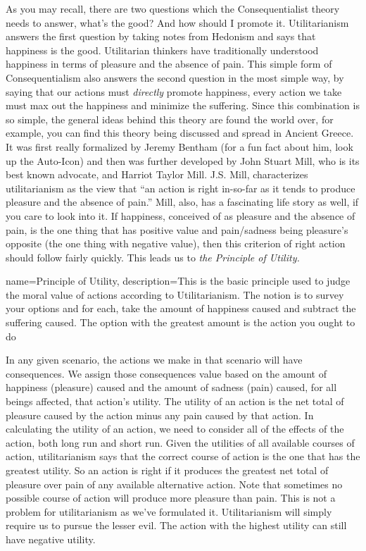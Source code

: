 As you may recall, there are two questions which the Consequentialist theory needs to answer, what's the good? And how should I promote it. Utilitarianism answers the first question by taking notes from Hedonism and says that happiness is the good. Utilitarian thinkers have traditionally understood happiness in terms of pleasure and the absence of pain. This simple form of Consequentialism also answers the second question in the most simple way, by saying that our actions must \emph{directly} promote happiness, every action we take must max out the happiness and minimize the suffering. Since this combination is so simple,  the general ideas behind this theory are found the world over, for example, you can find this theory being discussed and spread in Ancient Greece. It was first really formalized by Jeremy Bentham (for a fun fact about him, look up the Auto-Icon) and then was further developed by John Stuart Mill, who is its best known advocate, and Harriot Taylor Mill.\autocite{Driver3} J.S. Mill, characterizes utilitarianism as the view that “an action is right in-so-far as it tends to produce pleasure and the absence of pain.” Mill, also, has a fascinating life story as well, if you care to look into it.  If happiness, conceived of as pleasure and the absence of pain, is the one thing that has positive value and pain/sadness being pleasure's opposite (the one thing with negative value), then this criterion of right action should follow fairly quickly. This leads us to \emph{the \gls{Principle of Utility}.}

{
  name=Principle of Utility,
  description={This is the basic principle used to judge the moral value of actions according to Utilitarianism. The notion is to survey your options and for each, take the amount of happiness caused and subtract the suffering caused. The option with the greatest amount is the action you ought to do}
}


In any given scenario, the actions we make in that scenario will have consequences. We assign those consequences value based on the amount of happiness (pleasure) caused and the amount of sadness (pain) caused, for all beings affected, that action's utility. The utility of an action is the net total of pleasure caused by the action minus any pain caused by that action. In calculating the utility of an action, we need to consider all of the effects of the action, both long run and short run. Given the utilities of all available courses of action, utilitarianism says that the correct course of action is the one that has the greatest utility. So an action is right if it produces the greatest net total of pleasure over pain of any available alternative action. Note that sometimes no possible course of action will produce more pleasure than pain. This is not a problem for utilitarianism as we’ve formulated it. Utilitarianism will simply require us to pursue the lesser evil. The action with the highest utility can still have negative utility.

